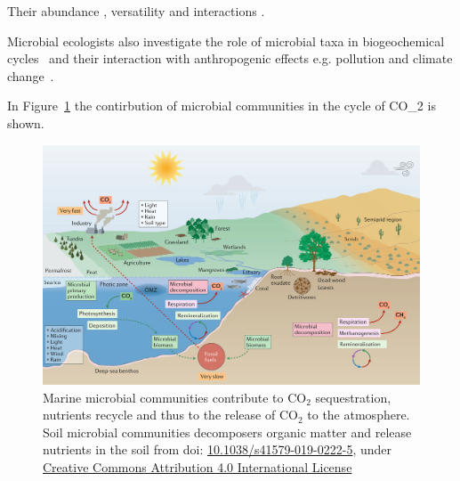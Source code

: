       Their abundance \citep{bar2018biomass}, versatility \citep{rees2017improving} 
      and interactions \citep{rottjers2018hairballs}. 



      Microbial ecologists also investigate the role of microbial taxa in 
      biogeochemical cycles~\cite{falkowski2008microbial} and their interaction 
      with anthropogenic effects e.g. pollution and climate change~\cite{cavicchioli2019scientists}.

      In Figure~\ref{fig:co2} the contirbution of microbial communities 
      in the cycle of CO\_2 is shown. 



       
      \begin{figure}[h]
         \centering
         \includegraphics[width=135mm]{figures/ecosystem_functioning.png}
         \caption[The cycle of C and the role of microbial communiites]{Marine microbial communities contribute to CO$_2$ sequestration, nutrients recycle and thus to the release of CO$_2$ to the atmosphere. 
         Soil microbial communities decomposers organic matter and release nutrients in the soil 
         from \citep{cavicchioli2019scientists} doi: \href{https://doi.org/10.1038/s41579-019-0222-5}{10.1038/s41579-019-0222-5}, under \href{http://creativecommons.org/licenses/by/4.0 license}{Creative Commons Attribution 4.0 International License}
         }
         \label{fig:co2}
      \end{figure}







